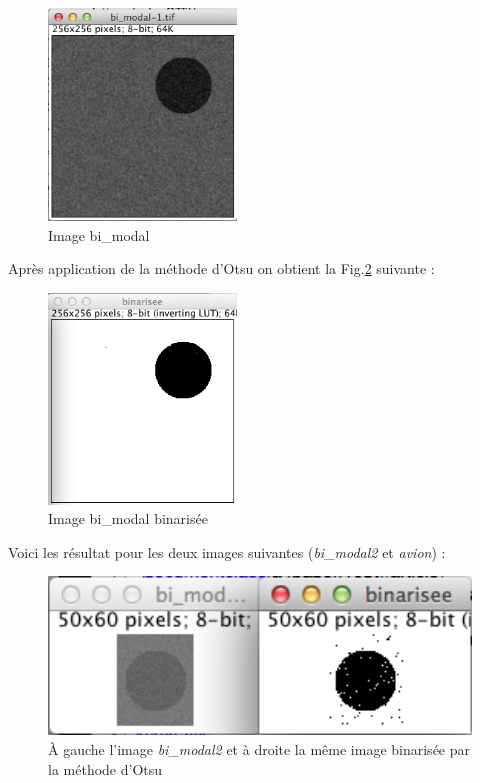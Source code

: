 \documentclass[a4paper,10pt]{article}
\begin{document}
\begin{figure}[ht]
\begin{center}
	\includegraphics[width=5cm]{images/bi_modal}
\end{center}
	\caption{Image bi\_modal}
	\label{bi_modal}
\end{figure}

Apr\`es application de la m\'ethode d'Otsu on obtient la Fig.\ref{binarisee} suivante : 

\begin{figure}[ht]
\begin{center}
	\includegraphics[width=5cm]{images/bi_modal_binarisee}
\end{center}
	\caption{Image bi\_modal binaris\'ee}
	\label{binarisee}
\end{figure}

\newpage

Voici les r\'esultat pour les deux images suivantes (\emph{bi\_modal2} et \emph{avion}) :

\begin{figure}[ht]
\begin{center}
	\includegraphics[width=13cm]{images/bi_modal_2}
\end{center}
	\caption{\`A gauche l'image \emph{bi\_modal2} et \`a droite la m\^eme image binaris\'ee par la m\'ethode d'Otsu}
	\label{}
\end{figure}
\end{document}
